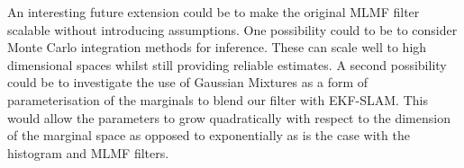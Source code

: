 An interesting future extension could be to make the original MLMF filter scalable without introducing assumptions.
One possibility could to be to consider Monte Carlo integration methods for inference. These can scale well to high dimensional 
spaces whilst still providing reliable estimates. A second possibility could be to investigate the use of Gaussian Mixtures as a 
form of parameterisation of the marginals to blend our filter with EKF-SLAM. This would allow the parameters 
to grow quadratically with respect to the dimension of the marginal space as opposed to exponentially as is the case 
with the histogram and MLMF filters.



